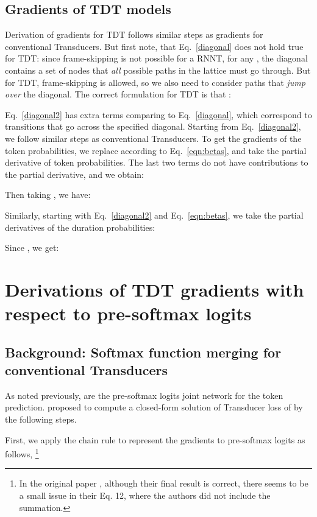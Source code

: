 \documentclass{article}
\begin{document}
\subsection{Gradients of TDT models}

Derivation of gradients for TDT follows similar steps as gradients for conventional Transducers. But first note, that Eq.~\ref{diagonal} does not hold true for TDT: since frame-skipping is not possible for a RNNT, for any , the diagonal  contains a set of nodes that \emph{all} possible paths in the lattice must go through. But for TDT, frame-skipping is allowed, so we also need to consider paths that \emph{jump over} the diagonal. The correct formulation for TDT is that : 

Eq.~\ref{diagonal2} has extra terms comparing to Eq.~\ref{diagonal}, which correspond to transitions that go across the specified diagonal.
Starting from Eq.~\ref{diagonal2}, we follow similar steps as conventional Transducers.
To get the gradients of the token probabilities, we replace  according to 
Eq.~\ref{eqn:betas},  and take the partial derivative of token probabilities. The last two terms do not have contributions to the partial derivative, and we obtain:

Then taking , we have:

Similarly, starting with Eq.~\ref{diagonal2} and Eq.~\ref{eqn:betas}, we take the partial derivatives of the duration probabilities:

Since , we get:







\section{ Derivations of TDT gradients with respect to pre-softmax logits}

\subsection{Background: Softmax function merging for conventional Transducers}
As noted previously,  are the pre-softmax logits joint network for the token prediction. 
\cite{li2019improving} proposed to compute a closed-form solution of Transducer loss of  by the following steps. 

First, we apply the chain rule
to represent the gradients to pre-softmax logits as follows, \footnote{In the original paper \cite{li2019improving}, although their final result is correct, there seems to be a small issue in their Eq. 12, where the authors did not include the summation.}
\end{document}

